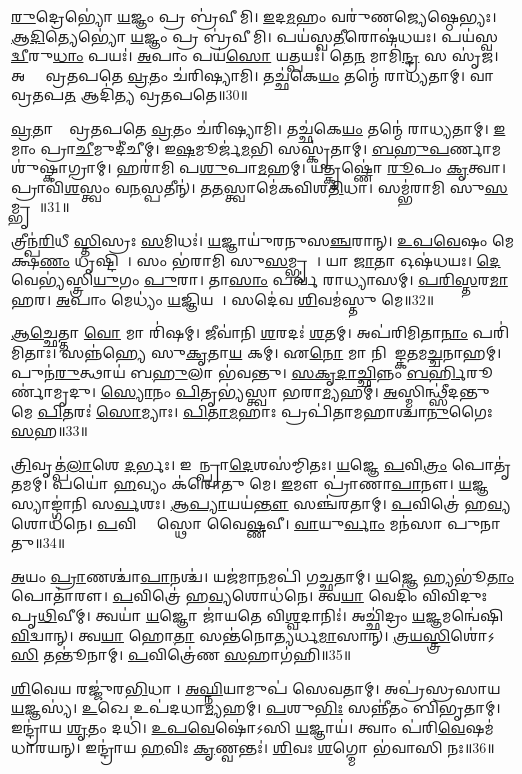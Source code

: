 \ul{𑌰𑍁}𑌦𑍍𑌰𑍇𑌭𑍍𑌯𑍋॑ \ul{𑌯}𑌜𑍍𑌞𑌂 𑌪𑍍𑌰 𑌬𑍍𑌰॑𑌵𑍀𑌮𑌿।
\ul{𑌇}𑌦\ul{𑌮}𑌹𑌂 𑌵𑌰𑍁॑𑌣𑌜𑍍𑌯𑍇𑌷𑍍𑌠𑍇𑌭𑍍𑌯𑌃।
\ul{𑌆}\ul{𑌦𑌿}𑌤𑍍𑌯𑍇𑌭𑍍𑌯𑍋॑ \ul{𑌯}𑌜𑍍𑌞𑌂 𑌪𑍍𑌰 𑌬𑍍𑌰॑𑌵𑍀𑌮𑌿।
𑌪𑌯॑𑌸𑍍𑌵\ul{𑌤𑍀}𑌰𑍋𑌷॑𑌧𑌯𑌃।
𑌪𑌯॑𑌸𑍍𑌵\ul{𑌦𑍍𑌵𑍀}𑌰𑍁\ul{𑌧𑌾𑌂} 𑌪𑌯𑌃॑।
\ul{𑌅}𑌪𑌾𑌂 𑌪𑌯॑\ul{𑌸𑍋} 𑌯𑌤𑍍𑌪𑌯𑌃॑।
𑌤𑍇\ul{𑌨} 𑌮𑌾𑌮𑌿॑\ul{𑌨𑍍𑌦𑍍𑌰} 𑌸 𑌸𑍃॑𑌜।
𑌅𑌗𑍍𑌨𑍇᳚ 𑌵𑍍𑌰𑌤𑌪𑌤𑍇 \ul{𑌵𑍍𑌰}𑌤𑌂 𑌚॑𑌰𑌿𑌷𑍍𑌯𑌾𑌮𑌿।
𑌤𑌚𑍍𑌛॑𑌕𑍇\ul{𑌯𑌂} 𑌤𑌨𑍍𑌮𑍇॑ 𑌰𑌾𑌧𑍍𑌯𑌤𑌾𑌮𑍍।
𑌵𑌾𑌯𑍋᳚ 𑌵𑍍𑌰𑌤𑌪\ul{𑌤} 𑌆𑌦𑌿॑𑌤𑍍𑌯 𑌵𑍍𑌰𑌤𑌪𑌤𑍇॥30॥

\ul{𑌵𑍍𑌰}𑌤𑌾𑌨𑌾𑌂᳚ 𑌵𑍍𑌰𑌤𑌪𑌤𑍇 \ul{𑌵𑍍𑌰}𑌤𑌂 𑌚॑𑌰𑌿𑌷𑍍𑌯𑌾𑌮𑌿।
𑌤𑌚𑍍𑌛॑𑌕𑍇\ul{𑌯𑌂} 𑌤𑌨𑍍𑌮𑍇॑ 𑌰𑌾𑌧𑍍𑌯𑌤𑌾𑌮𑍍।
\ul{𑌇}𑌮𑌾𑌂 𑌪𑍍𑌰𑌾\ul{𑌚𑍀}𑌮𑍁𑌦𑍀॑𑌚𑍀𑌮𑍍।
𑌇\ul{𑌷}𑌮𑍂𑌰𑍍𑌜॑\ul{𑌮}𑌭𑌿 𑌸𑌸𑍍𑌕𑍃॑𑌤𑌾𑌮𑍍।
\ul{𑌬}\ul{𑌹𑍁}\ul{𑌪}𑌰𑍍𑌣𑌾𑌮𑌶𑍁॑𑌷𑍍𑌕𑌾𑌗𑍍𑌰𑌾𑌮𑍍।
𑌹𑌰𑌾॑𑌮𑌿 𑌪\ul{𑌶𑍁}𑌪𑌾\ul{𑌮}𑌹𑌮𑍍।
𑌯𑌤𑍍𑌕𑍃𑌷𑍍𑌣𑍋॑ \ul{𑌰𑍂}𑌪𑌂 \ul{𑌕𑍃}𑌤𑍍𑌵𑌾।
𑌪𑍍𑌰𑌾𑌵𑌿॑\ul{𑌶}𑌸𑍍𑌤𑍍𑌵𑌂 𑌵\ul{𑌨}𑌸𑍍𑌪𑌤𑍀𑌨𑍍॑।
𑌤\ul{𑌤}𑌸𑍍𑌤𑍍𑌵𑌾𑌮𑍇॑𑌕𑌵𑌿𑌶\ul{𑌤𑌿}𑌧𑌾।
𑌸𑌮𑍍𑌭॑𑌰𑌾𑌮𑌿 𑌸𑍁\ul{𑌸}𑌮𑍍𑌭𑍃𑌤𑌾᳚॥31॥

𑌤𑍍𑌰𑍀𑌨𑍍𑌪॑\ul{𑌰𑌿}𑌧𑍀 \ul{𑌸𑍍𑌤𑌿}𑌸𑍍𑌰𑌃 \ul{𑌸}𑌮𑌿𑌧𑌃॑।
\ul{𑌯}𑌜𑍍𑌞𑌾𑌯𑍁॑𑌰𑌨𑍁𑌸\ul{𑌞𑍍𑌚}𑌰𑌾𑌨𑍍।
\ul{𑌉}\ul{𑌪}\ul{𑌵𑍇}𑌷𑌂 𑌮𑍇𑌕𑍍𑌷॑\ul{𑌣𑌂} 𑌧𑍃𑌷𑍍𑌟𑌿𑌮𑍍᳚।
𑌸𑌂 𑌭॑𑌰𑌾𑌮𑌿 𑌸𑍁\ul{𑌸}𑌮𑍍𑌭𑍃𑌤𑌾᳚।
𑌯𑌾 \ul{𑌜𑌾}𑌤𑌾 𑌓𑌷॑𑌧𑌯𑌃।
\ul{𑌦𑍇}𑌵𑍇𑌭𑍍𑌯॑𑌸𑍍𑌤𑍍𑌰𑌿\ul{𑌯𑍁}𑌗𑌂 \ul{𑌪𑍁}𑌰𑌾।
𑌤𑌾\ul{𑌸𑌾𑌂} 𑌪𑌰𑍍𑌵॑ 𑌰𑌾𑌧𑍍𑌯𑌾𑌸𑌮𑍍।
\ul{𑌪}\ul{𑌰𑌿}\ul{𑌸𑍍𑌤}𑌰\ul{𑌮𑌾}𑌹𑌰\sn{}।
\ul{𑌅}𑌪𑌾𑌂 𑌮𑍇𑌧𑍍𑌯𑌂॑ \ul{𑌯}𑌜𑍍𑌞𑌿𑌯𑌮𑍍᳚।
𑌸𑌦𑍇॑𑌵 \ul{𑌶𑌿}𑌵𑌮॑𑌸𑍍𑌤𑍁 𑌮𑍇॥32॥

\ul{𑌆}\ul{𑌚𑍍𑌛𑍇}𑌤𑍍𑌤𑌾 \ul{𑌵𑍋} 𑌮𑌾 𑌰𑌿॑𑌷𑌮𑍍।
𑌜𑍀𑌵𑌾॑𑌨𑌿 \ul{𑌶}𑌰𑌦𑌃॑ \ul{𑌶}𑌤𑌮𑍍।
𑌅𑌪॑𑌰𑌿𑌮𑌿𑌤𑌾\ul{𑌨𑌾𑌂} 𑌪𑌰𑌿॑𑌮𑌿𑌤𑌾𑌃।
𑌸𑌨𑍍𑌨॑𑌹𑍍𑌯𑍇 𑌸𑍁\ul{𑌕𑍃}𑌤𑌾\ul{𑌯} 𑌕𑌮𑍍।
𑌏\ul{𑌨𑍋} 𑌮𑌾 𑌨𑌿𑌗𑌾᳚𑌙𑍍𑌕\ul{𑌤}𑌮\ul{𑌚𑍍𑌚}𑌨𑌾𑌹𑌮𑍍।
𑌪𑍁𑌨॑\ul{𑌰𑍁}𑌤𑍍𑌥𑌾𑌯॑ 𑌬\ul{𑌹𑍁}𑌲𑌾 𑌭॑𑌵𑌨𑍍𑌤𑍁।
\ul{𑌸}\ul{𑌕𑍃}\ul{𑌦𑌾}\ul{𑌚𑍍𑌛𑌿}𑌨𑍍𑌨𑌂 \ul{𑌬}\ul{𑌰𑍍}𑌹𑌿𑌰𑍂𑌰𑍍𑌣𑌾॑𑌮𑍃𑌦𑍁।
\ul{𑌸𑍍𑌯𑍋}𑌨𑌂 \ul{𑌪𑌿}𑌤𑍃𑌭𑍍𑌯॑𑌸𑍍𑌤𑍍𑌵𑌾 𑌭𑌰𑌾\ul{𑌮𑍍𑌯}𑌹𑌮𑍍।
\ul{𑌅}𑌸𑍍𑌮𑌿𑌨𑍍𑌥𑍍𑌸𑍀॑𑌦𑌨𑍍𑌤𑍁 𑌮𑍇 \ul{𑌪𑌿}𑌤𑌰𑌃॑ \ul{𑌸𑍋}𑌮𑍍𑌯𑌾𑌃।
\ul{𑌪𑌿}\ul{𑌤𑌾}\ul{𑌮}𑌹𑌾𑌃 𑌪𑍍𑌰𑌪𑌿॑𑌤𑌾𑌮𑌹𑌾𑌶𑍍𑌚𑌾\ul{𑌨𑍁}𑌗𑍈𑌃 \ul{𑌸}𑌹॥33॥

\ul{𑌤𑍍𑌰𑌿}𑌵𑍃𑌤𑍍𑌪॑\ul{𑌲𑌾}𑌶𑍇 \ul{𑌦}𑌰𑍍𑌭𑌃।
𑌇𑌯𑌾᳚𑌨𑍍𑌪𑍍𑌰𑌾\ul{𑌦𑍇}𑌶𑌸॑𑌮𑍍𑌮𑌿𑌤𑌃।
\ul{𑌯}𑌜𑍍𑌞𑍇 \ul{𑌪}𑌵𑌿\ul{𑌤𑍍𑌰𑌂} 𑌪𑍋𑌤𑍃॑𑌤𑌮𑌮𑍍।
𑌪𑌯𑍋॑ \ul{𑌹}𑌵𑍍𑌯𑌂 𑌕॑𑌰𑍋𑌤𑍁 𑌮𑍇।
\ul{𑌇}𑌮𑍗 𑌪𑍍𑌰𑌾॑𑌣𑌾\ul{𑌪𑌾}𑌨𑍗।
\ul{𑌯}𑌜𑍍𑌞𑌸𑍍𑌯𑌾𑌙𑍍𑌗𑌾॑𑌨𑌿 𑌸\ul{𑌰𑍍𑌵}𑌶𑌃।
\ul{𑌆}\ul{𑌪𑍍𑌯𑌾}𑌯𑌯॑\ul{𑌨𑍍𑌤𑍗} 𑌸𑌞𑍍𑌚॑𑌰𑌤𑌾𑌮𑍍।
\ul{𑌪}𑌵𑌿𑌤𑍍𑌰𑍇॑ 𑌹\ul{𑌵𑍍𑌯}𑌶𑍋𑌧॑𑌨𑍇।
\ul{𑌪}𑌵𑌿𑌤𑍍𑌰𑍇᳚ 𑌸𑍍𑌥𑍋 𑌵𑍈\ul{𑌷𑍍𑌣}𑌵𑍀।
\ul{𑌵𑌾}𑌯𑍁\ul{𑌰𑍍𑌵𑌾𑌂} 𑌮𑌨॑𑌸𑌾 𑌪𑍁𑌨𑌾𑌤𑍁॥34॥

\ul{𑌅}𑌯𑌂 \ul{𑌪𑍍𑌰𑌾}𑌣𑌶𑍍𑌚𑌾॑\ul{𑌪𑌾}𑌨𑌶𑍍𑌚॑।
𑌯𑌜॑𑌮𑌾\ul{𑌨}𑌮𑌪𑌿॑ 𑌗𑌚𑍍𑌛𑌤𑌾𑌮𑍍।
\ul{𑌯}𑌜𑍍𑌞𑍇 𑌹𑍍𑌯𑌭𑍂॑\ul{𑌤𑌾𑌂} 𑌪𑍋𑌤𑌾॑𑌰𑍗।
\ul{𑌪}𑌵𑌿𑌤𑍍𑌰𑍇॑ 𑌹\ul{𑌵𑍍𑌯}𑌶𑍋𑌧॑𑌨𑍇।
𑌤𑍍𑌵\ul{𑌯𑌾} 𑌵𑍇𑌦𑌿𑌂॑ 𑌵𑌿𑌵𑌿𑌦𑍁𑌃 𑌪𑍃\ul{𑌥𑌿}𑌵𑍀𑌮𑍍।
𑌤𑍍𑌵𑌯𑌾॑ \ul{𑌯}𑌜𑍍𑌞𑍋 𑌜𑌾॑𑌯𑌤𑍇 𑌵𑌿\ul{𑌶𑍍𑌵}𑌦𑌾𑌨𑌿𑌃॑।
𑌅𑌚𑍍𑌛𑌿॑𑌦𑍍𑌰𑌂 \ul{𑌯}𑌜𑍍𑌞𑌮𑌨𑍍𑌵𑍇॑𑌷𑌿 \ul{𑌵𑌿}𑌦𑍍𑌵𑌾𑌨𑍍।
𑌤𑍍𑌵\ul{𑌯𑌾} 𑌹𑍋\ul{𑌤𑌾} 𑌸𑌨𑍍𑌤॑𑌨𑍋𑌤𑍍𑌯𑌰𑍍𑌧\ul{𑌮𑌾}𑌸𑌾𑌨𑍍।
\ul{𑌤𑍍𑌰}\ul{𑌯}\ul{𑌸𑍍𑌤𑍍𑌰𑌿}\ul{}𑌶𑍋॑𑌽\ul{𑌸𑌿} 𑌤𑌨𑍍𑌤𑍂॑𑌨𑌾𑌮𑍍।
\ul{𑌪}𑌵𑌿𑌤𑍍𑌰𑍇॑𑌣 \ul{𑌸}𑌹𑌾𑌗॑𑌹𑌿॥35॥

\ul{𑌶𑌿}𑌵𑍇𑌯 𑌰𑌜𑍍𑌜𑍁॑𑌰\ul{𑌭𑌿}𑌧𑌾𑌨𑍀᳚।
\ul{𑌅}\ul{𑌘𑍍𑌨𑌿}𑌯𑌾𑌮𑍁𑌪॑ 𑌸𑍇𑌵𑌤𑌾𑌮𑍍।
𑌅𑌪𑍍𑌰॑𑌸𑍍𑌰𑌸𑌾𑌯 \ul{𑌯}𑌜𑍍𑌞𑌸𑍍𑌯॑।
\ul{𑌉}𑌖𑍇 𑌉𑌪॑𑌦𑌧𑌾\ul{𑌮𑍍𑌯}𑌹𑌮𑍍।
\ul{𑌪}𑌶𑍁\ul{𑌭𑌿𑌃} 𑌸𑌨𑍍𑌨𑍀॑𑌤𑌂 𑌬𑌿𑌭𑍃𑌤𑌾𑌮𑍍।
𑌇𑌨𑍍𑌦𑍍𑌰𑌾॑𑌯 \ul{𑌶𑍃}𑌤𑌂 𑌦𑌧𑌿॑।
\ul{𑌉}\ul{𑌪}\ul{𑌵𑍇}𑌷𑍋॑𑌽𑌸𑌿 \ul{𑌯}𑌜𑍍𑌞𑌾𑌯॑।
𑌤𑍍𑌵𑌾𑌂 𑌪॑𑌰𑌿\ul{𑌵𑍇}𑌷𑌮॑𑌧𑌾𑌰𑌯𑌨𑍍।
𑌇𑌨𑍍𑌦𑍍𑌰𑌾॑𑌯 \ul{𑌹}𑌵𑌿𑌃 \ul{𑌕𑍃}𑌣𑍍𑌵𑌨𑍍𑌤𑌃॑।
\ul{𑌶𑌿}𑌵𑌃 \ul{𑌶}𑌗𑍍𑌮𑍋 𑌭॑𑌵𑌾𑌸𑌿 𑌨𑌃॥36॥

